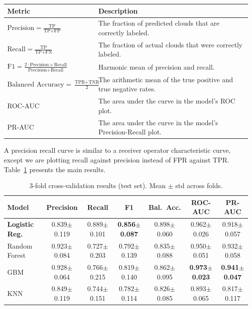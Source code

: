 \documentclass[11pt,letterpaper]{article}
\begin{document}
\renewcommand{\arraystretch}{1.3}
\begin{tabular}{l p{10cm}}
\textbf{Metric} & \textbf{Description} \\
\hline
$\text{Precision} = \frac{\text{TP}}{\text{TP} + \text{FP}}$ 
& The fraction of predicted clouds that are correctly labeled. \\

$\text{Recall} = \frac{\text{TP}}{\text{TP} + \text{FN}}$ 
& The fraction of actual clouds that were correctly labeled. \\

$\text{F1} = \frac{2 \cdot \text{Precision} \times \text{Recall}}{\text{Precision} + \text{Recall}}$ 
& Harmonic mean of precision and recall. \\

$\text{Balanced Accuracy} = \frac{\text{TPR} + \text{TNR}}{2}$  
& The arithmetic mean of the true positive and true negative rates. \\

ROC-AUC 
& The area under the curve in the model's ROC plot. \\

PR-AUC 
& The area under the curve in the model's Precision-Recall plot.
\end{tabular}
\vspace{10pt}

A precision recall curve is similar to a receiver operator characteristic curve, except we are plotting recall against precision instead of FPR against TPR. Table~\ref{tab:cv_results} presents the main results.

\begin{table}[H]
\centering
\small
\begin{tabular}{lcccccc}
\toprule
Model & Precision & Recall & F1 & Bal.\ Acc. & ROC-AUC & PR-AUC \\
\midrule
\textbf{Logistic Reg.} 
& 0.839$\pm$0.119 
& 0.889$\pm$0.101 
& \textbf{0.856$\pm$0.087} 
& 0.898$\pm$0.060 
& 0.962$\pm$0.026 
& 0.918$\pm$0.057 \\

Random Forest 
& 0.923$\pm$0.084 
& 0.727$\pm$0.203 
& 0.792$\pm$0.139 
& 0.835$\pm$0.088 
& 0.950$\pm$0.051 
& 0.932$\pm$0.058 \\

GBM 
& 0.928$\pm$0.064 
& 0.766$\pm$0.215 
& 0.819$\pm$0.140 
& 0.862$\pm$0.095 
& \textbf{0.973$\pm$0.023} 
& \textbf{0.941$\pm$0.047} \\

KNN 
& 0.849$\pm$0.119 
& 0.744$\pm$0.151 
& 0.782$\pm$0.114 
& 0.826$\pm$0.085 
& 0.893$\pm$0.065 
& 0.817$\pm$0.117 \\
\bottomrule
\end{tabular}
\caption{3-fold cross-validation results (test set). Mean $\pm$ std across folds.}
\label{tab:cv_results}
\end{table}
\end{document}
